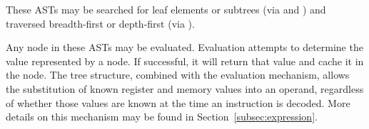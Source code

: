 These ASTs may be searched for leaf elements or subtrees (via 
 and ) and traversed breadth-\/first or depth-\/first
(via ).

Any node in these ASTs may be evaluated. Evaluation attempts to determine the
value represented by a node. If successful, it will return that value and cache
it in the node. The tree structure, combined with the evaluation mechanism,
allows the substitution of known register and memory values into an operand,
regardless of whether those values are known at the time an instruction is
decoded. More details on this mechanism may be found in
Section~\ref{subsec:expression}.
